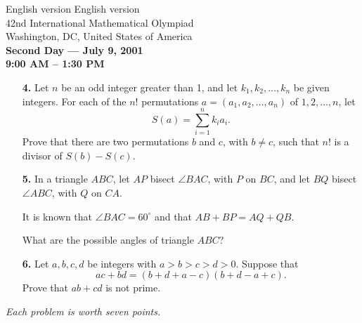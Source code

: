 \documentclass[12pt]{article}
\begin{document}
\begin{center}
{ English version \hfill English version } \\
\bigskip
{\Large 42nd International Mathematical Olympiad} \\
{\large Washington, DC, United States of America} \\
\medskip
{\large
\textbf{Second Day --- July 9, 2001} \\
\textbf{9:00 AM -- 1:30 PM}\\
}
\end{center}

\vspace{0.5in}

\begin{enumerate}
\item[\textbf{4.}] Let $n$ be an odd integer greater than 1,
and let $k_1, k_2, \dots, k_n$ be given integers. For each of the
$n!$ permutations $a=(a_1, a_2, \dots, a_n)$ of $1, 2, \dots, n$,
let
\[
S(a) = \sum_{i=1}^n k_i a_i.
\]
Prove that there are two permutations $b$ and $c$, with $b \neq
c$, such that $n!$ is a divisor of $S(b) - S(c)$.

\vspace{0.5in}

\item[\textbf{5.}] In a triangle $ABC$, let $AP$
bisect $\angle BAC$, with $P$ on $BC$, and let $BQ$ bisect $\angle
ABC$, with $Q$ on $CA$.

It is known that $\angle BAC = 60^{\circ}$ and that $AB+BP =
AQ+QB$.

What are the possible angles of triangle $ABC$?

\vspace{0.5in}

\item[\textbf{6.}]
Let $a, b, c, d$ be integers
with $a>b>c>d>0$. Suppose that
\[
ac+bd = (b+d+a-c)(b+d-a+c).
\]
Prove that $ab+cd$ is not prime.

\end{enumerate}

\vspace{1in} \noindent \textit{Each problem is worth seven
points.}
\end{document}
